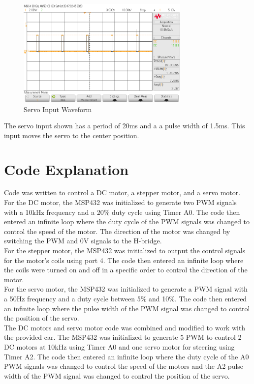 \documentclass[CMPE]{KGCOEReport}
\begin{document}
\begin{figure}[H]
    \centering
    \includegraphics[width=0.75\textwidth]{ServoWave.png}
    \caption{Servo Input Waveform}
    \label{fig:ServoWave}
\end{figure}

The servo input shown has a period of 20ms and a a pulse width of 1.5ms. This input moves the servo to the center position.

\section*{Code Explanation}

Code was written to control a DC motor, a stepper motor, and a servo motor. For the DC motor, the MSP432 was initialized to generate two PWM signals with a 10kHz frequency and a 20\% duty cycle using Timer A0. The code then entered an infinite loop where the duty cycle of the PWM signals was changed to control the speed of the motor. The direction of the motor was changed by switching the PWM and 0V signals to the H-bridge.\\
For the stepper motor, the MSP432 was initialized to output the control signals for the motor's coils using port 4. The code then entered an infinite loop where the coils were turned on and off in a specific order to control the direction of the motor.\\
For the servo motor, the MSP432 was initialized to generate a PWM signal with a 50Hz frequency and a duty cycle between 5\% and 10\%. The code then entered an infinite loop where the pulse width of the PWM signal was changed to control the position of the servo.\\
The DC motors and servo motor code was combined and modified to work with the provided car. The MSP432 was initialized to generate 5 PWM to control 2 DC motors at 10kHz using Timer A0 and one servo motor for steering using Timer A2. The code then entered an infinite loop where the duty cycle of the A0 PWM signals was changed to control the speed of the motors and the A2 pulse width of the PWM signal was changed to control the position of the servo.\\
\end{document}
